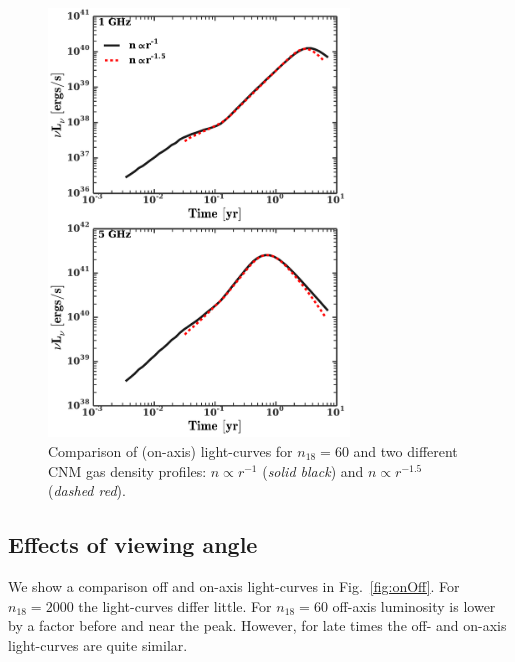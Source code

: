 \documentclass[usenatbib,fleqn]{mnras}
\begin{document}
\begin{figure} 
  \includegraphics[width=8cm]{profs2.pdf}
  \caption{\label{fig:profs2} Comparison of (on-axis) light-curves for
    $n_{18}=60$ and two different CNM gas density profiles: $n\propto
    r^{-1}$ ({\it solid black}) and $n\propto r^{-1.5}$ ({\it dashed
      red}).}
\end{figure}

\subsection{Effects of viewing angle}
We show a comparison off and on-axis light-curves in
Fig.~\ref{fig:onOff}.  For $n_{18}=2000$ the light-curves differ
little.  For $n_{18}=60$ off-axis luminosity is lower by a factor
before and near the peak. However, for late times
the off- and on-axis light-curves are quite similar.
\end{document}
